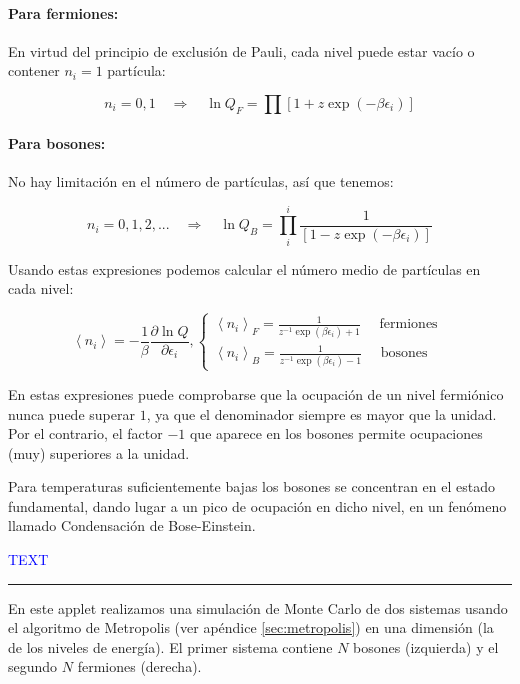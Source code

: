 \documentclass[11pt, a4paper]{article} %
\theoremstyle{named}
\begin{document}
\paragraph{Para fermiones:} En virtud del principio de exclusión de Pauli, cada nivel puede estar vacío o contener $n_i = 1$ partícula:

$$
n_{i}=0,1 \quad \Longrightarrow \quad \ln Q_{F} = \prod\left[1+z \exp \left(-\beta \epsilon_{i}\right)\right]
$$

\paragraph{Para bosones:} No hay limitación en el número de partículas, así que tenemos:

$$
n_{i}=0,1,2, ... \quad \Longrightarrow \quad \ln Q_{B} =\prod_{i}^{i} \frac{1}{\left[1-z \exp \left(-\beta \epsilon_{i}\right)\right]}
$$

Usando estas expresiones podemos calcular el número medio de partículas en cada nivel:

\begin{equation}
\left\langle n_{i}\right\rangle=-\frac{1}{\beta} \frac{\partial \ln Q}{\partial \epsilon_{i}},
\left\{\begin{array}{l}{\left\langle n_{i}\right\rangle_{F}=\frac{1}{z^{-1} \exp \left(\beta \epsilon_{i}\right)+1} \quad \text { fermiones }} \\ {\left\langle n_{i}\right\rangle_{B}=\frac{1}{z^{-1} \exp \left(\beta \epsilon_{i}\right)-1} \quad \text { bosones }}\end{array}\right.
\end{equation}

En estas expresiones puede comprobarse que la ocupación de un nivel fermiónico nunca puede superar $1$, ya que el denominador siempre es mayor que la unidad. Por el contrario, el factor $-1$ que aparece en los bosones permite ocupaciones (muy) superiores a la unidad.

Para temperaturas suficientemente bajas los bosones se concentran en el estado fundamental, dando lugar a un pico de ocupación en dicho nivel, en un fenómeno llamado Condensación de Bose-Einstein.

\textcolor{blue}{TEXT}

\noindent\rule{\linewidth}{0.4pt}

En este applet realizamos una simulación de Monte Carlo de dos sistemas usando el algoritmo de Metropolis (ver apéndice \ref{sec:metropolis}) en una dimensión (la de los niveles de energía). El primer sistema contiene $N$ bosones (izquierda) y el segundo $N$ fermiones (derecha).
\end{document}
